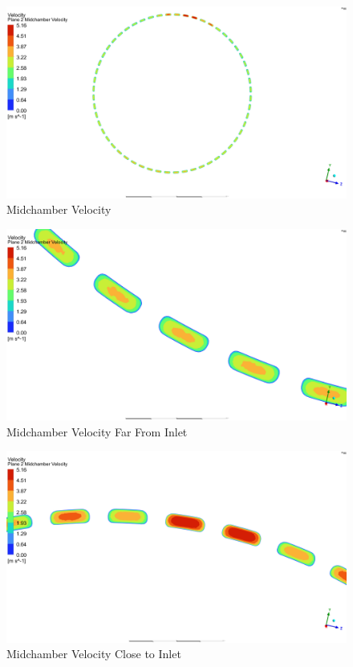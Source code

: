 \begin{figure}
    \centering
    \includegraphics[width=1\linewidth]{Midchamber Velocity.png}
    \caption{Midchamber Velocity}
    \label{fig:Midchamber Velocity}
\end{figure}
\begin{figure}
    \centering
    \includegraphics[width=1\linewidth]{Midchamber Velocity Far From Inlet.png}
    \caption{Midchamber Velocity Far From Inlet}
    \label{fig:Midchamber Velocity Far From Inlet}
\end{figure}
\begin{figure}
    \centering
    \includegraphics[width=1\linewidth]{Images/Midchamber Velocity Close to Inlet.png}
    \caption{Midchamber Velocity Close to Inlet}
    \label{fig:Midchamber Velocity Close to Inlet}
\end{figure}

